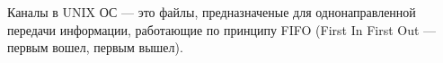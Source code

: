 Каналы в UNIX ОС --- это файлы, предназначеные для однонаправленной передачи информации, работающие по принципу FIFO (First In First Out --- первым вошел, первым вышел).